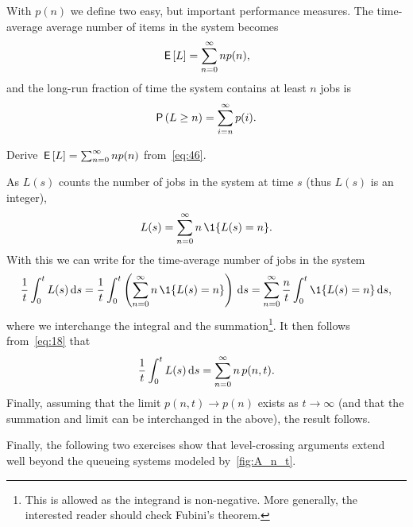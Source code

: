 With $p(n)$ we define two easy, but important performance measures.
The time-average average number of items in the system becomes
\begin{equation*}
\,\mathsf{E}\left[L\right] = \sum_{n=0}^\infty n p(n),
\end{equation*}
and the long-run fraction of time the system contains at least $n$ jobs is
\begin{equation*}
 \P{ L \geq n} = \sum_{i=n}^\infty p(i).
\end{equation*}

\begin{exercise}
 Derive $\,\mathsf{E}\left[L\right] = \sum_{n=0}^\infty n p(n)$ from~\cref{eq:46}. 
\begin{solution}
As $L(s)$ counts the number of jobs in the system at time $s$ (thus $L(s)$ is an integer),
\begin{equation*}
 L(s) = \sum_{n=0}^\infty n\, \1{L(s) = n}.
\end{equation*}
With this we can write for the time-average number of jobs in the system
\begin{equation}\label{eq:1}
\frac 1 t \int_0^t L(s) \d s = \frac 1 t \int_0^t \left(\sum_{n=0}^{\infty} n\, \1{L(s) = n}\right) \d s
= \sum_{n=0}^{\infty} \frac n t \int_0^t \1{L(s) = n} \d s,
\end{equation}
where we interchange the integral and the summation\footnote{This is allowed as the integrand is non-negative.
 More generally, the interested reader should check Fubini's theorem.}.
It then follows from~\cref{eq:18} that
\begin{equation*}
\frac 1 t \int_0^t L(s) \,\text{d}s = \sum_{n=0}^{\infty} n\, p(n,t).
\end{equation*}
Finally, assuming that the limit $p(n,t) \to p(n)$ exists as
$t\to\infty$ (and that the summation and limit can be interchanged in
the above), the result follows.
\end{solution}
\end{exercise}






Finally, the following two exercises show that level-crossing arguments extend well beyond the queueing systems modeled by~\cref{fig:A_n_t}.

